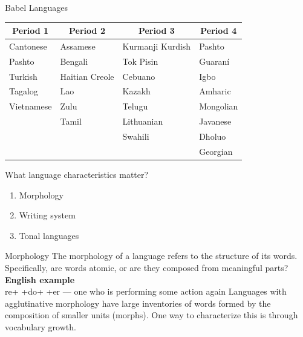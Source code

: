\begin{frame}{Babel Languages}{}
  \begin{center}
    \begin{tabular}{@{}llll@{}} \toprule
      \multicolumn{1}{c}{\bf Period 1} & \multicolumn{1}{c}{\bf Period 2} & \multicolumn{1}{c}{\bf Period 3} & \multicolumn{1}{c}{\bf Period 4} \\ \midrule
      Cantonese  & Assamese       & Kurmanji Kurdish & Pashto \\
      Pashto     & Bengali        & Tok Pisin        & Guaran\'{i} \\
      Turkish    & Haitian Creole & Cebuano          & Igbo \\
      Tagalog    & Lao            & Kazakh           & Amharic \\
      Vietnamese & Zulu           & Telugu           & Mongolian \\
                 & Tamil          & Lithuanian       & Javanese \\
                 &                & Swahili          & Dholuo \\
                 &                &                  & Georgian \\ \bottomrule
    \end{tabular}
  \end{center}
\end{frame}

\begin{frame}{What language characteristics matter?}{}
  \begin{enumerate}
  \item Morphology
  \item Writing system
  \item Tonal languages
  \end{enumerate}
\end{frame}

\begin{frame}{Morphology}{}
  The morphology of a language refers to the structure of its words.
  Specifically, are words atomic, or are they composed from meaningful
  parts?
  \vfill
  {\color{DarkerBlue}\bf English example} \\
  re+ +do+ +er --- one who is performing some action again
  \vfill
  Languages with \alert{agglutinative} morphology have large
  inventories of words formed by the composition of smaller units
  (morphs).
  \vfill
  One way to characterize this is through vocabulary growth.
\end{frame}

